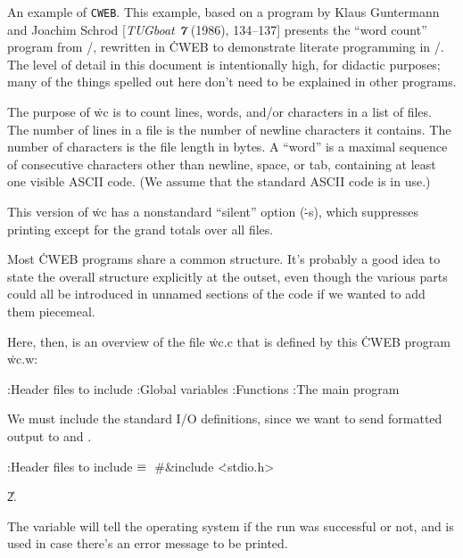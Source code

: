 

\nocon %
\datethis %
\def\SPARC{SPARC\-\kern.1em station}


An example of {\tt CWEB}.  This example, based on a program by
Klaus Guntermann and Joachim Schrod [{\sl TUGboat\/ \bf7} (1986),
134--137] presents the ``word count'' program from \UNIX/, rewritten in
\.{CWEB} to demonstrate literate programming in \CEE/.  The level of
detail in this document is intentionally high, for didactic purposes;
many of the things spelled out here don't need to be explained in
other programs.

The purpose of \.{wc} is to count lines, words, and/or characters in a
list of files. The number of lines in a file is the number of newline
characters it contains. The number of characters is the file length in bytes.
A ``word'' is a maximal sequence of consecutive characters other than
newline, space, or tab, containing at least one visible ASCII code.
(We assume that the standard ASCII code is in use.)

This version of \.{wc} has a nonstandard ``silent'' option (\.{-s}),
which suppresses printing except for the grand totals over all files.

\fi

Most \.{CWEB} programs share a common structure.  It's probably a
good idea to state the overall structure explicitly at the outset,
even though the various parts could all be introduced in unnamed
sections of the code if we wanted to add them piecemeal.

Here, then, is an overview of the file \.{wc.c} that is defined
by this \.{CWEB} program \.{wc.w}:

\Y\B{}:Header files to include\X\6
:Global variables\X\6
:Functions\X\6
:The main program\X\par
\fi

We must include the standard I/O definitions, since we want to send
formatted output to  and .

\Y\B\4:Header files to include\X${}\equiv{}$\6
\8\#\&{include} \.{<stdio.h>}\par
\U2.\fi

 The  variable will tell the operating system if the run
was
successful or not, and  is used in case there's an error
message to
be printed.

